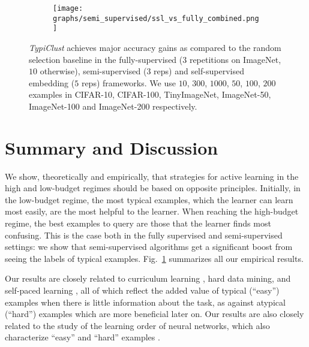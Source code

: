 \documentclass{article}
\begin{document}
\begin{figure}[htb!]
\begin{center}
    \begin{subfigure}{.46\textwidth}
      \centering
      \texttt{[image: graphs/semi\_supervised/ssl\_vs\_fully\_combined.png]}
\vspace{-0.5cm}
    \end{subfigure}
\vspace{-0.25cm}
\caption{
\textit{TypiClust} achieves major accuracy gains as compared to the random selection baseline in the fully-supervised ($3$ repetitions on ImageNet, $10$ otherwise), semi-supervised ($3$ reps) and self-supervised embedding ($5$ reps) frameworks. We use $10$, $300$, $1000$, $50$, $100$, $200$ examples in CIFAR-10, CIFAR-100, TinyImageNet, ImageNet-50, ImageNet-100 and ImageNet-200 respectively.}\vspace{-0.7cm}
\label{fig:semi_supervised_vs_fully_acc_improvement}
\end{center}
\end{figure}

\section{Summary and Discussion}
We show, theoretically and empirically, that strategies for active learning in the high and low-budget regimes should be based on opposite principles. Initially, in the low-budget regime, the most typical examples, which the learner can learn most easily, are the most helpful to the learner. When reaching the high-budget regime, the best examples to query are those that the learner finds most confusing. This is the case both in the fully supervised and semi-supervised settings: we show that semi-supervised algorithms get a significant boost from seeing the labels of typical examples. Fig.~\ref{fig:semi_supervised_vs_fully_acc_improvement} summarizes all our empirical results.



Our results are closely related to curriculum learning \citep{bengio2009curriculum,hacohen2019power,weinshall2020theory}, hard data mining, and self-paced learning \citep{kumar2010self}, all of which reflect the added value of typical (``easy'') examples when there is little information about the task, as against atypical (``hard'') examples  which are more beneficial later on. Our results are also closely related to the study of the learning order of neural networks, which also characterize ``easy'' and ``hard'' examples \citet{gissin2019discriminative,hacohen2020let,shah2020pitfalls,hacohen2021principal,choshen2021grammar}.
\end{document}
